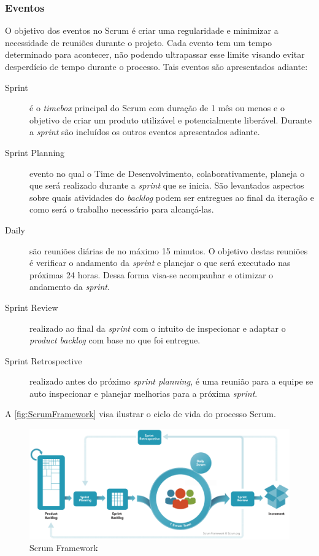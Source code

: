 \subsubsection{Eventos}

O objetivo dos eventos no Scrum é criar uma regularidade e minimizar a necessidade
de reuniões durante o projeto. Cada evento tem um tempo determinado para acontecer,
não podendo ultrapassar esse limite visando evitar desperdício de tempo durante o
processo. Tais eventos são apresentados adiante:

\begin{description}
    \item[Sprint] é o \textit{timebox} principal do Scrum com duração de 1 mês ou
    menos e o objetivo de criar um produto utilizável e potencialmente liberável.
    Durante a \textit{sprint} são incluídos os outros eventos apresentados adiante.
    \item[Sprint Planning] evento no qual o Time de Desenvolvimento, colaborativamente,
    planeja o que será realizado durante a \textit{sprint} que se inicia. São
    levantados aspectos sobre quais atividades do \textit{backlog} podem ser entregues
    ao final da iteração e como será o trabalho necessário para alcançá-las.
    \item[Daily] são reuniões diárias de no máximo 15 minutos. O objetivo destas
    reuniões é verificar o andamento da \textit{sprint} e planejar o que será executado
    nas próximas 24 horas. Dessa forma visa-se acompanhar e otimizar o andamento da
    \textit{sprint}.
    \item[Sprint Review] realizado ao final da \textit{sprint} com o intuito de
    inspecionar e adaptar o \textit{product backlog} com base no que foi entregue.
    \item[Sprint Retrospective] realizado antes do próximo \textit{sprint planning}, é
    uma reunião para a equipe se auto inspecionar e planejar melhorias para a próxima
    \textit{sprint}.
\end{description}

A \autoref{fig:ScrumFramework} visa ilustrar o ciclo de vida do processo Scrum.

    \begin{figure}[h]
      \caption{Scrum Framework\label{fig:ScrumFramework}}
      \centering
      \includegraphics[keepaspectratio=true,scale=0.4]{figuras/scrumFramework.eps}
    \end{figure}

